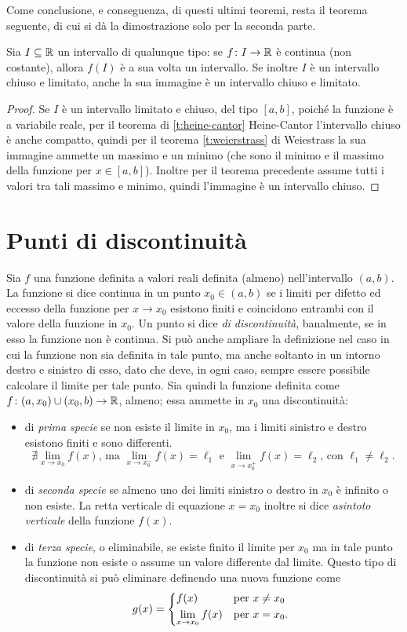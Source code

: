 Come conclusione, e conseguenza, di questi ultimi teoremi, resta il teorema seguente, di cui si dà la dimostrazione solo per la seconda parte.
\begin{teorema}[Darboux]
\label{t:darboux}
Sia $I\subseteq\mathbb{R}$ un intervallo di qualunque tipo: se $f\colon I\to\mathbb{R}$ è continua (non costante), allora $f(I)$ è a sua volta un intervallo. Se inoltre $I$ è un intervallo chiuso e limitato, anche la sua immagine è un intervallo chiuso e limitato.
\end{teorema}
\begin{proof}
Se $I$ è un intervallo limitato e chiuso, del tipo $[a,b]$, poiché la funzione è a variabile reale, per il teorema di \ref{t:heine-cantor} Heine-Cantor l'intervallo chiuso è anche compatto, quindi per il teorema \ref{t:weierstrass} di Weiestrass la sua immagine ammette un massimo e un minimo (che sono il minimo e il massimo della funzione per $x\in[a,b]$). Inoltre per il teorema precedente assume tutti i valori tra tali massimo e minimo, quindi l'immagine è un intervallo chiuso.
\end{proof}

\section{Punti di discontinuità}
Sia $f$ una funzione definita a valori reali definita (almeno) nell'intervallo $(a,b)$. La funzione si dice continua in un punto $x_0\in (a,b)$ se i limiti per difetto ed eccesso della funzione per $x\to x_0$ esistono finiti e coincidono entrambi con il valore della funzione in $x_0$.
Un punto si dice \emph{di discontinuità}, banalmente, se in esso la funzione non è continua. Si può anche ampliare la definizione nel caso in cui la funzione non sia definita in tale punto, ma anche soltanto in un intorno destro e sinistro di esso, dato che deve, in ogni caso, sempre essere possibile calcolare il limite per tale punto.
Sia quindi la funzione definita come $f\colon(a,x_0)\cup(x_0,b)\to\mathbb{R}$, almeno; essa ammette in $x_0$ una discontinuità:
\begin{itemize}
\item di \emph{prima specie} se non esiste il limite in $x_0$, ma i limiti sinistro e destro esistono finiti e sono differenti.
\[
\nexists\lim_{x\to x_0} f(x)\text{, ma }\lim_{x\to x_0^-} f(x)=\ell_1\text{ e }\lim_{x\to x_0^+} f(x)=\ell_2\text{, con }\ell_1\neq\ell_2.
\]
\item di \emph{seconda specie} se almeno uno dei limiti sinistro o destro in $x_0$ è infinito o non esiste. La retta verticale di equazione $x=x_0$ inoltre si dice \emph{asintoto verticale} della funzione $f(x)$.
\item di \emph{terza specie}, o eliminabile, se esiste finito il limite per $x_0$ ma in tale punto la funzione non esiste o assume un valore differente dal limite. Questo tipo di discontinuità si può eliminare definendo una nuova funzione come
\[
g(x)=
	\begin{dcases*}
	f(x)& per $x\neq x_0$\\
	\lim_{x\to x_0} f(x)& per $x=x_0$.
	\end{dcases*}
\]
\end{itemize}
